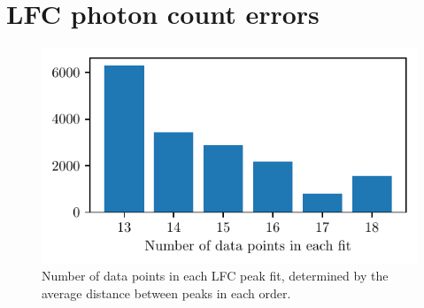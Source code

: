 

% 
% 
\section{LFC photon count errors}\label{appendix:LFC_errors} 

\begin{figure}%
    \begin{wide}  
    \includegraphics[scale=1]{figures/N_data_points.pdf}
    \caption{Number of data points in each LFC peak fit, determined by the average distance between peaks in each order.}
    \label{fig:N_data_points}
\end{wide}
\end{figure}


